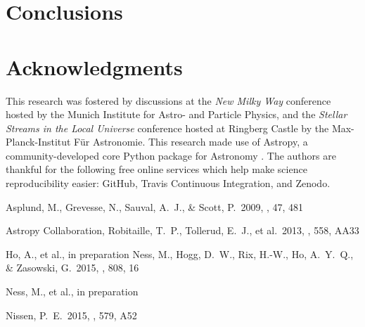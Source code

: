 \documentclass[useAMS,usenatbib]{mn2e}
\begin{document}




\section{Conclusions}

% 


\section*{Acknowledgments}
This research was fostered by discussions at the \textit{New Milky Way}
conference hosted by the Munich Institute for Astro- and Particle Physics, and
the \textit{Stellar Streams in the Local Universe} conference hosted at Ringberg
Castle by the Max-Planck-Institut F\"ur Astronomie. This research made use of 
Astropy, a community-developed core Python package for Astronomy \citep{astropy}.
The authors are thankful for the following free online services which help make
science reproducibility easier: GitHub, Travis Continuous Integration, and Zenodo.

\begin{thebibliography}{99}

 Asplund, M., Grevesse, N., Sauval, A.~J., \& Scott, P.\ 2009, \araa, 47, 481 

 Astropy Collaboration, Robitaille, T.~P., Tollerud, E.~J., et al.\ 2013, \aap, 558, AA33

 Ho, A., et al., in preparation
 Ness, M., Hogg, D.~W., Rix, H.-W., Ho, A.~Y.~Q., \& Zasowski, G.\ 2015, \apj, 808, 16 

 Ness, M., et al., in preparation

 Nissen, P.~E.\ 2015, \aap, 579, A52 


\end{thebibliography}


\label{lastpage}
\end{document}

